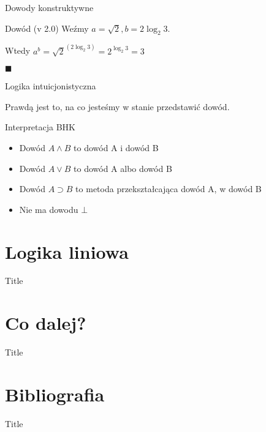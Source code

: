 \documentclass{beamer}
\begin{document}
\begin{frame}{Dowody konstruktywne}
    \begin{block}{Dowód (v 2.0)}
    Weźmy $ a=\sqrt{2}, b=2\log_2{3} $.
    
    Wtedy $ a^b = \sqrt{2}^{(2\log_2{3})} = 2^{\log_2{3}} = 3 $
    
    $\blacksquare$
    \end{block}
\end{frame}

\begin{frame}{Logika intuicjonistyczna}

    \begin{exampleblock}{}
    Prawdą jest to, na co jesteśmy w stanie przedstawić dowód.
    \end{exampleblock}
    
    \pause
    
    \begin{block}{Interpretacja BHK}
        \begin{itemize}
            \item Dowód $ A \land B $ to dowód A i dowód B
            \item Dowód $ A \lor B $ to dowód A albo dowód B
            \item Dowód $ A \supset B $ to metoda przekształcająca dowód A, w dowód B
            \item Nie ma dowodu $\bot$
        \end{itemize}
    \end{block}
\end{frame}

\section{Logika liniowa}
\begin{frame}{Title}
    
\end{frame}

\section{Co dalej?}
\begin{frame}{Title}
    
\end{frame}

\section*{Bibliografia}
\begin{frame}{Title}
    
\end{frame}
\end{document}
